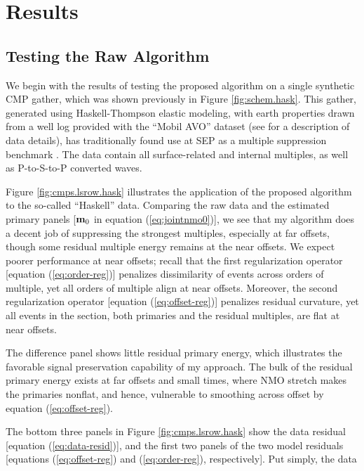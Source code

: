 \section{Results}
\subsection{Testing the Raw Algorithm}
We begin with the results of testing the proposed algorithm on a single synthetic CMP gather,
which was shown previously in Figure \ref{fig:schem.hask}.  This gather, generated using 
Haskell-Thompson elastic modeling, with earth properties drawn from a well log provided with
the ``Mobil AVO'' dataset (see \cite{Lumley.sep.82.25} for a description of data details), 
has traditionally found use at SEP as a multiple suppression benchmark 
\cite{Lumley.sep.82.25,Nichols.sep.82.1,Clapp.sep.102.bob2,Guitton.sep.103.antoine1,Clapp.sep.103.bob2}.  
The data contain all surface-related and internal multiples, as well as P-to-S-to-P converted waves.
\par
Figure \ref{fig:cmps.lsrow.hask} illustrates the application of the proposed algorithm to the
so-called ``Haskell'' data.  Comparing the raw data and the estimated primary panels 
[$\bold m_0$ in equation (\ref{eq:jointnmo0})], we see that my algorithm does a decent job of 
suppressing the strongest multiples, especially at far offsets, though some residual multiple 
energy remains at the near offsets.  We expect poorer performance at near offsets; recall that 
the first regularization operator [equation (\ref{eq:order-reg})] penalizes dissimilarity of 
events across orders of multiple, yet all orders of multiple align at near offsets.  Moreover, 
the second regularization operator [equation (\ref{eq:offset-reg})] penalizes residual curvature, 
yet all events in the section, both primaries and the residual multiples, are flat at near offsets. 
\par
The difference panel shows little residual primary energy, which illustrates the favorable signal
preservation capability of my approach.  The bulk of the residual primary energy exists at far 
offsets and small times, where NMO stretch makes the primaries nonflat, and hence, vulnerable to
smoothing across offset by equation (\ref{eq:offset-reg}).
\par
The bottom three panels in Figure \ref{fig:cmps.lsrow.hask} show the data residual 
[equation (\ref{eq:data-resid})], and the first two panels of the two model residuals
[equations (\ref{eq:offset-reg}) and (\ref{eq:order-reg}), respectively].  Put simply, the data 
